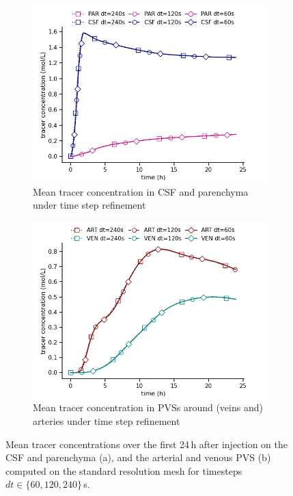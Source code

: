\documentclass[fleqn,10pt]{wlscirep}
\begin{document}
\begin{figure}
    \centering
    \begin{subfigure}[b]{0.45\textwidth}
        \centering
        \includegraphics[width = 1 \linewidth]{figures/time_refinement_par_csf_mean.png}
        \caption{Mean tracer concentration in CSF and parenchyma under time step refinement}
    \end{subfigure}
    \begin{subfigure}[b]{0.45\textwidth}
        \centering
     \includegraphics[width= 1\linewidth]{figures/time_refinement_art_ven_mean.png}
         \caption{Mean tracer concentration in PVSs around (veins and) arteries under time step refinement}
    \end{subfigure}
    \caption{Mean tracer concentrations over the first 24\,h after injection on the CSF and parenchyma (a), and the arterial and venous PVS (b) computed on the standard resolution mesh for timesteps $dt \in \{60, 120, 240 \}$\,s.}    \label{fig:time_convergence_concentrations}
\end{figure}
\end{document}
